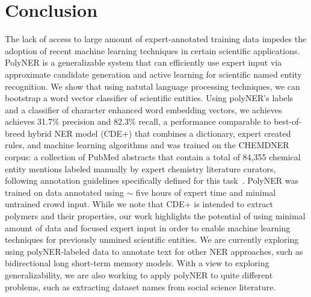 \section{Conclusion}
\label{sect:apner_conclusion}
The lack of access to large amount of expert-annotated training data impedes the adoption of recent machine learning techniques in certain scientific applications.
PolyNER is a generalizable system that can efficiently use expert input via approximate candidate generation and active learning for scientific named entity recognition.
We show that using natutal language processing techniques, we can bootstrap a word vector classifier of scientific entities.
Using polyNER's labels and a classifier of character enhanced word embedding vectors, we achieves achieves 31.7\% precision and 82.3\% recall,  a performance comparable to best-of-breed
\loganfussingaboutrecallandprecision
hybrid NER model (CDE+) that combines a dictionary, expert created
rules, and machine learning algorithms and was trained on the CHEMDNER corpus:
a collection of  PubMed abstracts that contain a total of 84,355 chemical entity mentions labeled manually by expert chemistry literature curators, following annotation guidelines specifically defined for this task~\cite{krallinger2015chemdner}. 
PolyNER was trained on data annotated using $\sim$ five hours of expert time and minimal untrained crowd input.
While we note that CDE+ is intended to extract polymers and their properties, our work highlights the potential of using minimal amount of data and focused expert input in order to enable machine learning techniques for previously unmined scientific entities. 
We are currently exploring using polyNER-labeled data to annotate text for other NER approaches,
such as bidirectional long short-term memory models.
With a view to exploring generalizability, we are also working to apply polyNER
to quite different problems, such as extracting dataset names from social science
literature. 
